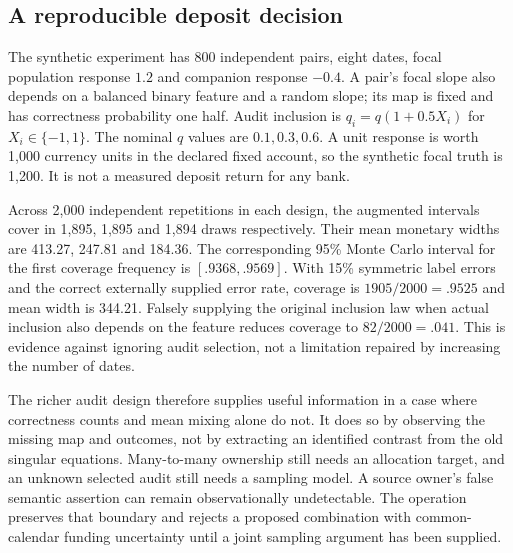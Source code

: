 \subsection{A reproducible deposit decision}
The synthetic experiment has 800 independent pairs, eight dates, focal
population response $1.2$ and companion response $-0.4$. A pair's focal slope
also depends on a balanced binary feature and a random slope; its map is fixed
and has correctness probability one half. Audit inclusion is
$q_i=q(1+0.5X_i)$ for $X_i\in\{-1,1\}$. The nominal $q$ values are
$0.1,0.3,0.6$. A unit response is worth 1,000 currency units in the declared
fixed account, so the synthetic focal truth is 1,200. It is not a measured
deposit return for any bank.

Across 2,000 independent repetitions in each design, the augmented intervals
cover in 1,895, 1,895 and 1,894 draws respectively. Their mean monetary widths
are 413.27, 247.81 and 184.36. The corresponding 95\% Monte Carlo interval
for the first coverage frequency is $[.9368,.9569]$. With 15\% symmetric
label errors and the correct externally supplied error rate, coverage is
$1905/2000=.9525$ and mean width is 344.21. Falsely supplying the original
inclusion law when actual inclusion also depends on the feature reduces
coverage to $82/2000=.041$. This is evidence against ignoring audit selection,
not a limitation repaired by increasing the number of dates.

The richer audit design therefore supplies useful information in a case where
correctness counts and mean mixing alone do not. It does so by observing the
missing map and outcomes, not by extracting an identified contrast from the
old singular equations. Many-to-many ownership still needs an allocation
target, and an unknown selected audit still needs a sampling model. A source
owner's false semantic assertion can remain observationally undetectable.
The operation preserves that boundary and rejects a proposed combination
with common-calendar funding uncertainty until a joint sampling argument
has been supplied.


